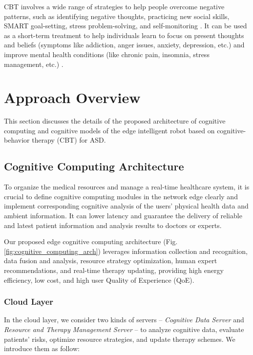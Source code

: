 \documentclass[letterpaper]{article} %
\begin{document}
CBT involves a wide range of strategies to help people overcome negative patterns, such as identifying negative thoughts, practicing new social skills, SMART goal-setting, stress problem-solving, and self-monitoring \cite{beck2020cognitive}. It can be used as a short-term treatment to help individuals learn to focus on present thoughts and beliefs (symptoms like addiction, anger issues, anxiety, depression, etc.) and improve mental health conditions (like chronic pain, insomnia, stress management, etc.) \cite{hofmann2012efficacy}.

\section{Approach Overview}
This section discusses the details of the proposed architecture of cognitive computing and cognitive models of the edge intelligent robot based on cognitive-behavior therapy (CBT) for ASD.

\subsection{Cognitive Computing Architecture}

To organize the medical resources and manage a real-time healthcare system, it is crucial to define cognitive computing modules in the network edge clearly and implement corresponding cognitive analysis of the users' physical health data and ambient information. It can lower latency and guarantee the delivery of reliable and latest patient information and analysis results to doctors or experts.

Our proposed edge cognitive computing architecture (Fig. \ref{fig:cognitive_computing_arch}) leverages information collection and recognition, data fusion and analysis, resource strategy optimization, human expert recommendations, and real-time therapy updating, providing high energy efficiency, low cost, and high user Quality of Experience (QoE). 

\subsubsection{Cloud Layer}

In the cloud layer, we consider two kinds of servers -- \textit{Cognitive Data Server} and \textit{Resource and Therapy Management Server} -- to analyze cognitive data, evaluate patients' risks, optimize resource strategies, and update therapy schemes. We introduce them as follow:
\end{document}
